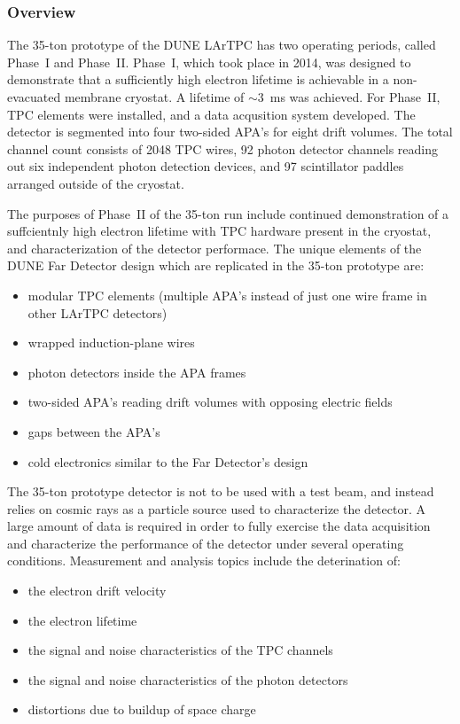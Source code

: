 \label{sec:35t}
\subsubsection{Overview}
The 35-ton prototype of the DUNE LArTPC has two operating periods, called Phase~I and Phase~II.  Phase~I, which took place
in 2014, was designed to demonstrate that a sufficiently high electron lifetime is achievable in a non-evacuated
membrane cryostat. A lifetime of $\sim$3~ms was achieved.  For Phase~II, TPC elements were installed, and
a data acqusition system developed.  The detector is segmented into four two-sided APA's for eight drift volumes.
The total channel count consists of 2048 TPC wires, 92 photon detector channels reading out six independent photon
detection devices, and 97 scintillator paddles arranged outside of the cryostat.

The purposes of Phase~II of the 35-ton run include continued demonstration of a suffcientnly high electron
lifetime with TPC hardware present in the cryostat, and characterization of the detector performace.
The unique elements of the DUNE Far Detector design which are replicated in the 35-ton
prototype are:
\begin{itemize}
\item  modular TPC elements (multiple APA's instead of just one wire frame in other LArTPC 
detectors)
\item wrapped induction-plane wires
\item photon detectors inside the APA frames
\item two-sided APA's reading drift volumes with opposing electric fields
\item gaps between the APA's
\item cold electronics similar to the Far Detector's design
\end{itemize}

The 35-ton prototype detector is not to be used with a test beam, and instead relies on cosmic rays as
a particle source used to characterize the detector.  A large amount
of data is required in order to fully exercise the data acquisition and characterize the 
performance of the detector under several operating conditions.  Measurement and analysis topics include
the deterination of:
\begin{itemize}
\item the electron drift velocity
\item the electron lifetime
\item the signal and noise characteristics of the TPC channels
\item the signal and noise characteristics of the photon detectors
\item distortions due to buildup of space charge
\end{itemize}

